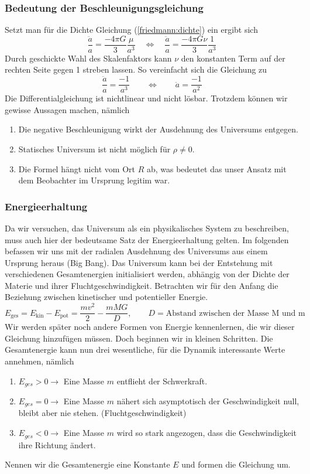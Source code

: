 \begin{refsection}
\subsubsection{Bedeutung der Beschleunigungsgleichung}
Setzt man für die Dichte Gleichung (\ref{friedmann:dichte}) ein ergibt sich
\[\frac{\ddot{a}}{a} = \frac{- 4 \pi G}{3} \frac{\mu}{a^3} \quad\Leftrightarrow \quad\frac{\ddot{a}}{a} = \frac{- 4 \pi G \nu}{3} \frac{1}{a^3}\]
Durch geschickte Wahl des Skalenfaktors kann $\nu$ den konstanten Term auf der rechten Seite gegen 1 streben lassen. So vereinfacht sich die Gleichung zu
\[\frac{\ddot{a}}{a} = \frac{-1}{a^3} \qquad\Leftrightarrow\qquad \ddot{a} = \frac{-1}{a^2}\]
Die Differentialgleichung ist nichtlinear  und nicht lösbar. Trotzdem können wir gewisse Aussagen machen, nämlich
\begin{enumerate}
	\item Die negative Beschleunigung wirkt der Ausdehnung des Universums entgegen. 
	\item Statisches Universum ist nicht möglich für $\rho \neq 0$.
	\item Die Formel hängt nicht vom Ort $R$ ab, was bedeutet das unser Ansatz mit dem Beobachter im Ursprung legitim war.
\end{enumerate}

\subsubsection{Energieerhaltung}
Da wir versuchen, das Universum als ein physikalisches System zu beschreiben, muss auch hier der bedeutsame Satz der Energieerhaltung gelten. Im folgenden befassen wir uns mit der radialen Ausdehnung des Universums aus einem Ursprung heraus (Big Bang). Das Universum kann bei der Entstehung mit verschiedenen Gesamtenergien initialisiert werden, abhängig von der Dichte der Materie und ihrer Fluchtgeschwindigkeit. Betrachten wir für den Anfang die Beziehung zwischen kinetischer und potentieller Energie.
\begin{equation}
E_{\text{ges}} = E_{\text{kin}} - E_{\text{pot}} =  \frac{m v^2}{2} - \frac{m M G }{D}, \qquad D = \text{Abstand zwischen der Masse M und m}
\end{equation}
Wir werden später noch andere Formen von Energie kennenlernen, die wir dieser Gleichung hinzufügen müssen. Doch beginnen wir in kleinen Schritten. Die Gesamtenergie kann nun drei wesentliche, für die Dynamik interessante Werte annehmen, nämlich
\begin{enumerate}
	\item $E_{ges} > 0 \rightarrow$ Eine Masse $m$ entflieht der Schwerkraft.
	\item $E_{ges} = 0 \rightarrow$ Eine Masse $m$ nähert sich asymptotisch  der Geschwindigkeit null, bleibt aber nie stehen. (Fluchtgeschwindigkeit)
	\item $E_{ges} < 0 \rightarrow$ Eine Masse $m$ wird so stark angezogen, dass die Geschwindigkeit ihre Richtung ändert.
\end{enumerate}
Nennen wir die Gesamtenergie eine Konstante $E$ und formen die Gleichung um.


\end{refsection}
